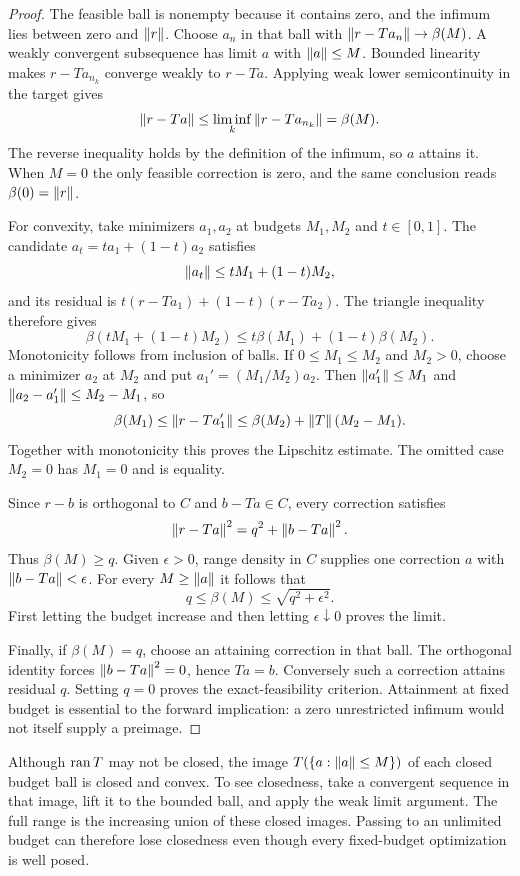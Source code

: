 \begin{proof}
The feasible ball is nonempty because it contains zero, and the infimum lies between zero and $\left\lVert r\right\rVert$. Choose $a_n$ in that ball with $\left\lVert r-Ta_n\right\rVert\to\beta(M)$. A weakly convergent subsequence has limit $a$ with $\left\lVert a\right\rVert\le M$. Bounded linearity makes $r-Ta_{n_k}$ converge weakly to $r-Ta$. Applying weak lower semicontinuity in the target gives
\[
 \left\lVert r-Ta\right\rVert\le\liminf_k\left\lVert r-Ta_{n_k}\right\rVert=\beta(M).
\]
The reverse inequality holds by the definition of the infimum, so $a$ attains it. When $M=0$ the only feasible correction is zero, and the same conclusion reads $\beta(0)=\left\lVert r\right\rVert$.

For convexity, take minimizers $a_1,a_2$ at budgets $M_1,M_2$ and $t\in[0,1]$. The candidate $a_t=ta_1+(1-t)a_2$ satisfies
\[
 \left\lVert a_t\right\rVert\le tM_1+(1-t)M_2,
\]
and its residual is $t(r-Ta_1)+(1-t)(r-Ta_2)$. The triangle inequality therefore gives
\[
 \beta(tM_1+(1-t)M_2)\le t\beta(M_1)+(1-t)\beta(M_2).
\]
Monotonicity follows from inclusion of balls. If $0\le M_1\le M_2$ and $M_2>0$, choose a minimizer $a_2$ at $M_2$ and put $a_1'=(M_1/M_2)a_2$. Then $\left\lVert a_1'\right\rVert\le M_1$ and $\left\lVert a_2-a_1'\right\rVert\le M_2-M_1$, so
\[
 \beta(M_1)\le\left\lVert r-Ta_1'\right\rVert
 \le\beta(M_2)+\left\lVert T\right\rVert(M_2-M_1).
\]
Together with monotonicity this proves the Lipschitz estimate. The omitted case $M_2=0$ has $M_1=0$ and is equality.

Since $r-b$ is orthogonal to $C$ and $b-Ta\in C$, every correction satisfies
\begin{equation}\label{KS:eq:range-decomposition}
 \left\lVert r-Ta\right\rVert^2=q^2+\left\lVert b-Ta\right\rVert^2.
\end{equation}
Thus $\beta(M)\ge q$. Given $\epsilon>0$, range density in $C$ supplies one correction $a$ with $\left\lVert b-Ta\right\rVert<\epsilon$. For every $M\ge\left\lVert a\right\rVert$ it follows that
\[
 q\le\beta(M)\le\sqrt{q^2+\epsilon^2}.
\]
First letting the budget increase and then letting $\epsilon\downarrow0$ proves the limit.

Finally, if $\beta(M)=q$, choose an attaining correction in that ball. The orthogonal identity forces $\left\lVert b-Ta\right\rVert^2=0$, hence $Ta=b$. Conversely such a correction attains residual $q$. Setting $q=0$ proves the exact-feasibility criterion. Attainment at fixed budget is essential to the forward implication: a zero unrestricted infimum would not itself supply a preimage.
\end{proof}

Although $\operatorname{ran} T$ may not be closed, the image $T(\{a:\left\lVert a\right\rVert\le M\})$ of each closed budget ball is closed and convex. To see closedness, take a convergent sequence in that image, lift it to the bounded ball, and apply the weak limit argument. The full range is the increasing union of these closed images. Passing to an unlimited budget can therefore lose closedness even though every fixed-budget optimization is well posed.


